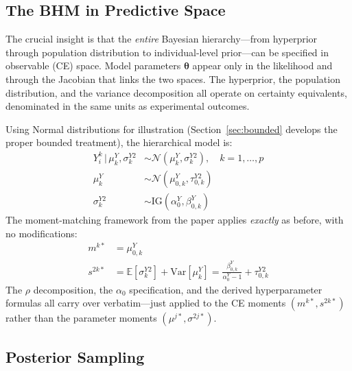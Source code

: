 \documentclass[11pt,a4paper]{article}
\theoremstyle{definition}
\newcommand{\E}{\mathbb{E}}
\newcommand{\Var}{\mathrm{Var}}
\newcommand{\Normal}{\mathcal{N}}
\newcommand{\IG}{\mathrm{IG}}
\newcommand{\given}{\,|\,}
\newcommand{\btheta}{\boldsymbol{\theta}}
\begin{document}
\subsection{The BHM in Predictive Space}

The crucial insight is that the \emph{entire} Bayesian hierarchy---from
hyperprior through population distribution to individual-level prior---can be
specified in observable (CE) space. Model parameters $\btheta$ appear only in
the likelihood and through the Jacobian that links the two spaces. The
hyperprior, the population distribution, and the variance decomposition all
operate on certainty equivalents, denominated in the same units as experimental
outcomes.

Using Normal distributions for illustration (Section~\ref{sec:bounded}
develops the proper bounded treatment), the hierarchical model is:
\begin{align}
    \label{eq:bhm_ce_subject}
    Y_i^k \given \mu_k^Y, \sigma_k^{Y2} &\sim
        \Normal(\mu_k^Y, \sigma_k^{Y2}), \quad k = 1, \ldots, p \\
    \label{eq:bhm_ce_mean}
    \mu_k^Y &\sim \Normal(\mu_{0,k}^Y, \tau_{0,k}^{Y2}) \\
    \label{eq:bhm_ce_var}
    \sigma_k^{Y2} &\sim \IG(\alpha_0^Y, \beta_{0,k}^Y)
\end{align}
The moment-matching framework from the paper applies \emph{exactly} as before,
with no modifications:
\begin{align}
    m^{k*} &= \mu_{0,k}^Y \\
    s^{2k*} &= \E[\sigma_k^{Y2}] + \Var[\mu_k^Y]
        = \frac{\beta_{0,k}^Y}{\alpha_0^Y - 1} + \tau_{0,k}^{Y2}
\end{align}
The $\rho$ decomposition, the $\alpha_0$ specification, and the derived
hyperparameter formulas all carry over verbatim---just applied to the CE moments
$(m^{k*}, s^{2k*})$ rather than the parameter moments
$(\mu^{j*}, \sigma^{2j*})$.

\subsection{Posterior Sampling}
\label{sec:posterior_sampling}
\end{document}

